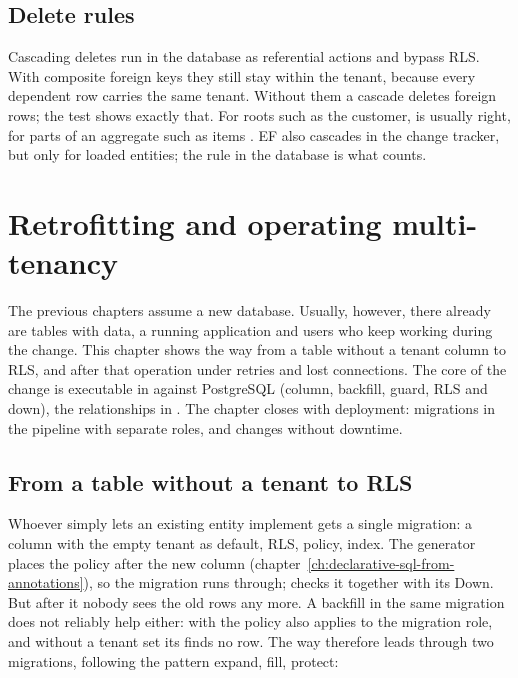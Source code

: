 \section{Delete rules}

Cascading deletes run in the database as referential actions and bypass RLS. With composite
foreign keys they still stay within the tenant, because every dependent row carries the same
tenant. Without them a cascade deletes foreign rows; the test
shows exactly that. For roots such as the customer,  is usually right, for parts of
an aggregate such as items . EF also cascades in the change tracker, but only for
loaded entities; the rule in the database is what counts.


\chapter{Retrofitting and operating multi-tenancy}\label{ch:retrofitting-and-operating}

The previous chapters assume a new database. Usually, however, there already are tables with
data, a running application and users who keep working during the change. This chapter shows the
way from a table without a tenant column to RLS, and after that operation under retries and lost
connections. The core of the change is executable in  against
PostgreSQL (column, backfill, guard, RLS and down), the relationships in
.
The chapter closes with deployment: migrations in the pipeline with separate roles, and changes
without downtime.

\section{From a table without a tenant to RLS}

Whoever simply lets an existing entity implement  gets a single
migration: a column with the empty tenant as default, RLS, policy, index. The generator places the
policy after the new column (chapter~\ref{ch:declarative-sql-from-annotations}), so the migration
runs through;  checks it together with its
Down. But after it nobody sees the old rows any more. A backfill in the same migration does not reliably help either: with
 the policy also applies to the migration role, and without a tenant
set its  finds no row. The way therefore leads through two migrations, following the
pattern expand, fill, protect:

